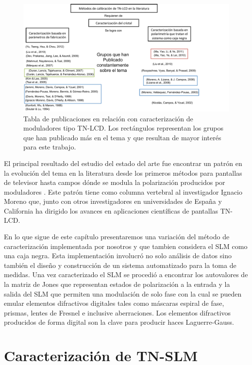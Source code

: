 \begin{figure}[h!]
\centering
\includegraphics[scale=.6]{articulos_metodos}
\caption[Publicaciones en relación a la caracterización de TN-LCD]{Tabla de publicaciones en relación con caracterización de
  moduladores tipo TN-LCD. Los rectángulos representan los grupos que
  han publicado más en el tema y que resultan de mayor interés para
  este trabajo. }
\label{fig:articulos_metodos}
\end{figure}
El principal resultado del estudio del estado del arte fue encontrar
un patrón en la evolución del tema en la literatura desde los primeros
métodos para pantallas de televisor  hasta campos
dónde se modula la polarización producidos por moduladores
. Este patrón tiene como columna vertebral al 
investigador Ignacio Moreno que, junto con otros investigadores en
universidades de España y California ha dirigido los avances en aplicaciones
científicas de pantallas TN-LCD. 

En lo que sigue de este capítulo presentaremos una variación del
método de caracterización  implementada por nosotros y que
tambien considera el SLM como una caja negra. Esta implementación
involucró no solo análisis de datos sino también el diseño y
construcción de un sistema automatizado para la toma de medidas. 
Una vez caracterizado el SLM se
procedió a encontrar los autovalores de la matriz de Jones que
representan estados de polarización a la entrada y la salida del SLM 
que permiten una modulación de solo fase con la cual se pueden emular
elementos difractivos digitales tales como máscaras espiral de fase, prismas,
lentes de Fresnel e inclusive aberraciones. Los elementos difractivos producidos de forma
digital son la clave para producir haces Laguerre-Gauss.

\section{Caracterización de TN-SLM}
\label{sec:ChGV_Caracterizacion_de_SLM}

